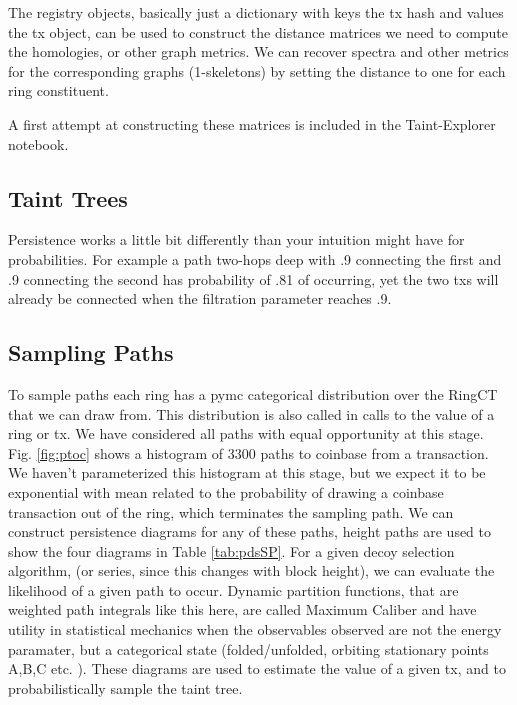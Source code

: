 The registry objects, basically just a dictionary with keys the tx hash and values the tx object, can be used to construct the distance matrices we need to compute the homologies, or other graph metrics.
We can recover spectra and other metrics for the corresponding graphs (1-skeletons) by setting the distance to one for each ring constituent.

A first attempt at constructing these matrices is included in the Taint-Explorer notebook.
    


\subsection{Taint Trees}

Persistence works a little bit differently than your intuition might have for probabilities.  
For example a path two-hops deep with .9 connecting the first and .9 connecting the second has probability of .81 of occurring, yet the two txs will already be connected when the filtration parameter reaches .9.  

\subsection{Sampling Paths}

To sample paths each ring has a pymc categorical distribution over the RingCT that we can draw from.  This distribution is also called in calls to the value of a ring or tx.
We have considered all paths with equal opportunity at this stage.  
Fig. \ref{fig:ptoc} shows a histogram of 3300 paths to coinbase from a transaction.  
We haven't parameterized this histogram at this stage, but we expect it to be exponential with mean related to the probability of drawing a coinbase transaction out of the ring, which terminates the sampling path.
We can construct persistence diagrams for any of these paths, height paths are used to show the four diagrams in Table \ref{tab:pdsSP}.
For a given decoy selection algorithm, (or series, since this changes with block height), we can evaluate the likelihood of a given path to occur.  
Dynamic partition functions, that are weighted path integrals like this here, are called Maximum Caliber and have utility in statistical mechanics when the observables observed are not the energy paramater, but a categorical state (folded/unfolded, orbiting stationary points A,B,C etc. ). 
These diagrams are used to estimate the value of a given tx, and to probabilistically sample the taint tree.
  
